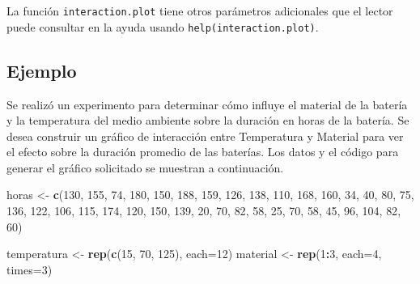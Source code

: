 \documentclass[10pt,]{krantz}
\makeatletter
\newenvironment{Shaded}{\begin{snugshade}}{\end{snugshade}}
\newcommand{\KeywordTok}[1]{\textcolor[rgb]{0.13,0.29,0.53}{\textbf{#1}}}
\newcommand{\DataTypeTok}[1]{\textcolor[rgb]{0.13,0.29,0.53}{#1}}
\newcommand{\DecValTok}[1]{\textcolor[rgb]{0.00,0.00,0.81}{#1}}
\newcommand{\StringTok}[1]{\textcolor[rgb]{0.31,0.60,0.02}{#1}}
\newcommand{\OperatorTok}[1]{\textcolor[rgb]{0.81,0.36,0.00}{\textbf{#1}}}
\newcommand{\NormalTok}[1]{#1}
\newenvironment{kframe}{%
\medskip{}
\setlength{\fboxsep}{.8em}
 \def\at@end@of@kframe{}%
 \ifinner\ifhmode%
  \def\at@end@of@kframe{\end{minipage}}%
  \begin{minipage}{\columnwidth}%
 \fi\fi%
 \def\FrameCommand##1{\hskip\@totalleftmargin \hskip-\fboxsep
 \colorbox{shadecolor}{##1}\hskip-\fboxsep
     \hskip-\linewidth \hskip-\@totalleftmargin \hskip\columnwidth}%
 \MakeFramed {\advance\hsize-\width
   \@totalleftmargin\z@ \linewidth\hsize
   \@setminipage}}%
 {\par\unskip\endMakeFramed%
 \at@end@of@kframe}
\renewenvironment{Shaded}{\begin{kframe}}{\end{kframe}}
\makeatother
\begin{document}
La función \texttt{interaction.plot} tiene otros parámetros adicionales
que el lector puede consultar en la ayuda usando
\texttt{help(interaction.plot)}.

\subsection*{Ejemplo}\label{ejemplo-26}


Se realizó un experimento para determinar cómo influye el material de la
batería y la temperatura del medio ambiente sobre la duración en horas
de la batería. Se desea construir un gráfico de interacción entre
Temperatura y Material para ver el efecto sobre la duración promedio de
las baterías. Los datos y el código para generar el gráfico solicitado
se muestran a continuación.

\begin{Shaded}
\begin{Highlighting}[]
\NormalTok{horas <-}\StringTok{ }\KeywordTok{c}\NormalTok{(}\DecValTok{130}\NormalTok{, }\DecValTok{155}\NormalTok{, }\DecValTok{74}\NormalTok{, }\DecValTok{180}\NormalTok{, }\DecValTok{150}\NormalTok{, }\DecValTok{188}\NormalTok{, }\DecValTok{159}\NormalTok{, }\DecValTok{126}\NormalTok{, }\DecValTok{138}\NormalTok{, }\DecValTok{110}\NormalTok{, }\DecValTok{168}\NormalTok{, }
           \DecValTok{160}\NormalTok{, }\DecValTok{34}\NormalTok{, }\DecValTok{40}\NormalTok{, }\DecValTok{80}\NormalTok{, }\DecValTok{75}\NormalTok{, }\DecValTok{136}\NormalTok{, }\DecValTok{122}\NormalTok{, }\DecValTok{106}\NormalTok{, }\DecValTok{115}\NormalTok{, }\DecValTok{174}\NormalTok{, }\DecValTok{120}\NormalTok{, }\DecValTok{150}\NormalTok{, }
           \DecValTok{139}\NormalTok{, }\DecValTok{20}\NormalTok{, }\DecValTok{70}\NormalTok{, }\DecValTok{82}\NormalTok{, }\DecValTok{58}\NormalTok{, }\DecValTok{25}\NormalTok{, }\DecValTok{70}\NormalTok{, }\DecValTok{58}\NormalTok{, }\DecValTok{45}\NormalTok{, }\DecValTok{96}\NormalTok{, }\DecValTok{104}\NormalTok{, }\DecValTok{82}\NormalTok{, }\DecValTok{60}\NormalTok{)}

\NormalTok{temperatura <-}\StringTok{ }\KeywordTok{rep}\NormalTok{(}\KeywordTok{c}\NormalTok{(}\DecValTok{15}\NormalTok{, }\DecValTok{70}\NormalTok{, }\DecValTok{125}\NormalTok{), }\DataTypeTok{each=}\DecValTok{12}\NormalTok{)}
\NormalTok{material    <-}\StringTok{ }\KeywordTok{rep}\NormalTok{(}\DecValTok{1}\OperatorTok{:}\DecValTok{3}\NormalTok{, }\DataTypeTok{each=}\DecValTok{4}\NormalTok{, }\DataTypeTok{times=}\DecValTok{3}\NormalTok{)}


\end{Highlighting}
\end{Shaded}
\end{document}
